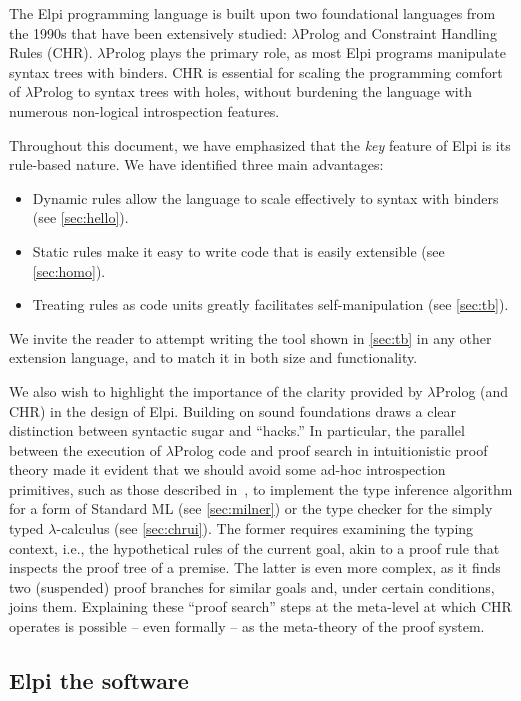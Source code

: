 \documentclass[a4paper, 11pt]{book}
\begin{document}
The Elpi programming language is built upon two foundational languages from the
1990s that have been extensively studied: $\lambda$Prolog and Constraint
Handling Rules (CHR). $\lambda$Prolog plays the primary role, as most Elpi
programs manipulate syntax trees with binders. CHR is essential for scaling the
programming comfort of $\lambda$Prolog to syntax trees with holes, without
burdening the language with numerous non-logical introspection features.

Throughout this document, we have emphasized that the \emph{key} feature of Elpi
is its rule-based nature. We have identified three main advantages:
\begin{itemize}
\item Dynamic rules allow the language to scale effectively to syntax with binders (see \cref{sec:hello}).
\item Static rules make it easy to write code that is easily extensible (see \cref{sec:homo}).
\item Treating rules as code units greatly facilitates self-manipulation (see \cref{sec:tb}).
\end{itemize}

We invite the reader to attempt writing the  tool shown in
\cref{sec:tb} in any other extension language, and to match it in both
size and functionality.

We also wish to highlight the importance of the clarity provided by
$\lambda$Prolog (and CHR) in the design of Elpi. Building on sound foundations
draws a clear distinction between syntactic sugar and ``hacks.'' In particular,
the parallel between the execution of $\lambda$Prolog code and proof search in
intuitionistic proof theory made it evident that we should avoid 
some ad-hoc introspection primitives, such as those described in~\cite[Section 8 and
later]{10.1145/3236788}, to implement the type inference algorithm for a form
of Standard ML (see \cref{sec:milner}) or the type checker for the
simply typed $\lambda$-calculus (see \cref{sec:chrui}). The former
requires examining the typing context, i.e., the hypothetical rules of the
current goal, akin to a proof rule that inspects the proof tree of a premise.
The latter is even more complex, as it finds two (suspended) proof branches for
similar goals and, under certain conditions, joins them. Explaining these
``proof search'' steps at the meta-level at which CHR operates is possible -- even
formally -- as the meta-theory of the proof system.


\subsection{Elpi the software}
\end{document}
